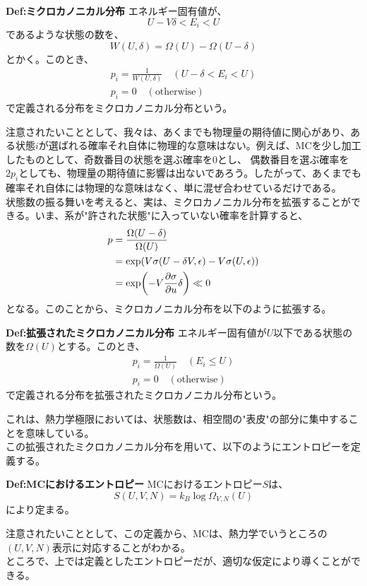 \documentclass[a4paper,11pt]{jsarticle}
\numberwithin{equation}{section}
\begin{document}
\begin{itembox}[l]{\textbf{Def:ミクロカノニカル分布}}
  エネルギー固有値が、
  \begin{equation}
    U - V\delta < E_{i} < U
  \end{equation}
  であるような状態の数を、
  \begin{equation}
    W(U,\delta) = \Omega (U) - \Omega(U-\delta)
  \end{equation}
  とかく。このとき、
  \begin{align}
    p_i = \frac{1}{W(U,\delta)} \quad (U-\delta < E_i < U)\\
    p_i = 0 \quad (\text{otherwise})
  \end{align}
  で定義される分布をミクロカノニカル分布という。
\end{itembox}

注意されたいこととして、我々は、あくまでも物理量の期待値に関心があり、ある状態$i$が選ばれる確率それ自体に物理的な意味はない。例えば、MCを少し加工したものとして、奇数番目の状態を選ぶ確率を$0$とし、
偶数番目を選ぶ確率を$2p_i$としても、物理量の期待値に影響は出ないであろう。したがって、あくまでも確率それ自体には物理的な意味はなく、単に混ぜ合わせているだけである。\\

状態数の振る舞いを考えると、実は、ミクロカノニカル分布を拡張することができる。いま、系が"許された状態"に入っていない確率を計算すると、
\begin{align}
  p &= \frac{\Omega(U-\delta)}{\Omega(U)}\\
  &= \exp(V\sigma(U-\delta V,\epsilon)-V\sigma(U,\epsilon))\\
  &= \exp(-V\pdv{\sigma}{u}\delta )
  \ll 0 
\end{align}
となる。このことから、ミクロカノニカル分布を以下のように拡張する。
\begin{itembox}[l]{\textbf{Def:拡張されたミクロカノニカル分布}}
  エネルギー固有値が$U$以下である状態の数を$\Omega(U)$とする。このとき、
  \begin{align}
    p_i = \frac{1}{\Omega(U)} \quad (E_i \leq U)\\
    p_i = 0 \quad (\text{otherwise})
  \end{align}
  で定義される分布を拡張されたミクロカノニカル分布という。
\end{itembox}
これは、熱力学極限においては、状態数は、相空間の"表皮"の部分に集中することを意味している。\\

この拡張されたミクロカノニカル分布を用いて、以下のようにエントロピーを定義する。\\
\begin{itembox}[l]{\textbf{Def:MCにおけるエントロピー}}
  MCにおけるエントロピー$S$は、
  \begin{equation}
    S(U,V,N) = k_{B} \log \Omega_{V,N}(U) \label{eq:mcentropy}
  \end{equation}
  により定まる。

\end{itembox}
注意されたいこととして、この定義から、MCは、熱力学でいうところの$(U,V,N)$表示に対応することがわかる。\\
ところで、上では定義としたエントロピーだが、適切な仮定により導くことができる。\\
\end{document}
